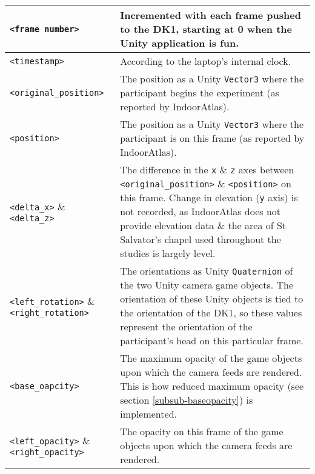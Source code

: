\begin{center}
\begin{longtable}{| l | p{8cm} |}

\hline

\texttt{<frame number>} & Incremented with each frame pushed to the DK1, starting at 0 when the Unity application is fun. \\

\hline

\texttt{<timestamp>} & According to the laptop's internal clock. \\

\hline

\texttt{<original\_position>} & The position as a Unity \texttt{Vector3} where the participant begins the experiment (as reported by IndoorAtlas). \\

\hline

\texttt{<position>} & The position as a Unity \texttt{Vector3} where the participant is on this frame (as reported by IndoorAtlas). \\

\hline

\texttt{<delta\_x>} \& \texttt{<delta\_z>} & The difference in the \texttt{x} \& \texttt{z} axes between \texttt{<original\_position>} \& \texttt{<position>} on this frame. Change in elevation (\texttt{y} axis) is not recorded, as IndoorAtlas does not provide elevation data \& the area of St Salvator's chapel used throughout the studies is largely level. \\

\hline

\texttt{<left\_rotation>} \& \texttt{<right\_rotation>} & The orientations as Unity \texttt{Quaternion} of the two Unity camera game objects. The orientation of these Unity objects is tied to the orientation of the DK1, so these values represent the orientation of the participant's head on this particular frame. \\

\hline

\texttt{<base\_oapcity>} & The maximum opacity of the game objects upon which the camera feeds are rendered. This is how reduced maximum opacity (see section \ref{subsub-baseopacity}) is implemented. \\

\hline

\texttt{<left\_opacity>} \& \texttt{<right\_opacity>} & The opacity on this frame of the game objects upon which the camera feeds are rendered. \\


\end{longtable}
\end{center}
